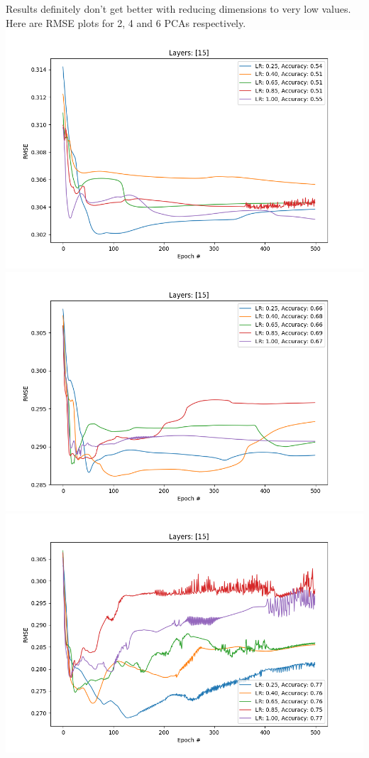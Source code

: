\documentclass[12pt, letterpaper]{article}
\begin{document}
\begin{enumerate}[label=\Roman*.]
	    Results definitely don't get better with reducing dimensions to very low values. Here are RMSE plots for 2, 4 and 6 PCAs respectively.
	    {\center \includegraphics[scale=0.6]{../images/pca_rmse_2.png} \\}
	    {\center \includegraphics[scale=0.6]{../images/pca_rmse_4.png} \\}
	    {\center \includegraphics[scale=0.6]{../images/pca_rmse_6.png} \\}
	    

\end{enumerate}
\end{document}

